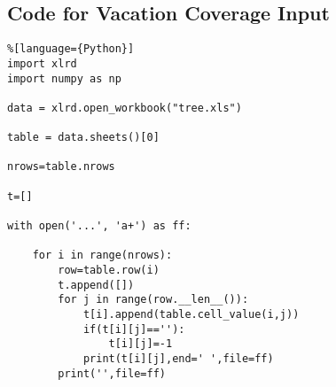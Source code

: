 \documentclass[./main.tex]{subfiles}
\begin{document}
    \subsection{Code for Vacation Coverage Input}
    \begin{spacing}
        \begin{lstlisting}%[language={Python}]
import xlrd
import numpy as np

data = xlrd.open_workbook("tree.xls")

table = data.sheets()[0]

nrows=table.nrows

t=[]

with open('...', 'a+') as ff:

    for i in range(nrows):
        row=table.row(i)
        t.append([])
        for j in range(row.__len__()):
            t[i].append(table.cell_value(i,j))
            if(t[i][j]==''):
                t[i][j]=-1
            print(t[i][j],end=' ',file=ff)
        print('',file=ff)

        \end{lstlisting}
    \end{spacing}
\end{document}
